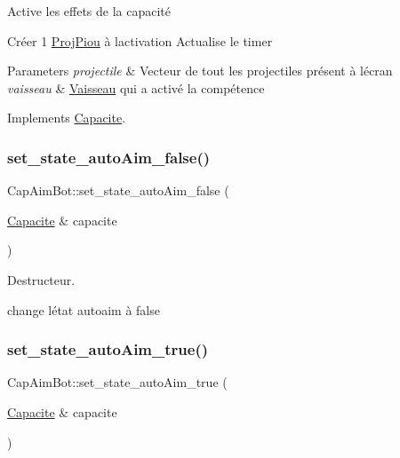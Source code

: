Active les effets de la capacité 

Créer 1 \mbox{\hyperlink{class_proj_piou}{Proj\+Piou}} à l\textquotesingle{}activation Actualise le timer 
\begin{DoxyParams}{Parameters}
{\em projectile} & Vecteur de tout les projectiles présent à l\textquotesingle{}écran \\
\hline
{\em vaisseau} & \mbox{\hyperlink{class_vaisseau}{Vaisseau}} qui a activé la compétence \\
\hline
\end{DoxyParams}


Implements \mbox{\hyperlink{class_capacite_a85355aeb1d4acc049ed97da177acbd5f}{Capacite}}.

\mbox{\label{class_cap_aim_bot_aaa7c76ca67faf851d511c7c46ccc8139}} 
\subsubsection{\texorpdfstring{set\+\_\+state\+\_\+auto\+Aim\+\_\+false()}{set\_state\_autoAim\_false()}}
{\footnotesize\ttfamily Cap\+Aim\+Bot\+::set\+\_\+state\+\_\+auto\+Aim\+\_\+false (\begin{DoxyParamCaption}\item[{\mbox{\hyperlink{class_capacite}{Capacite}} \&}]{capacite }\end{DoxyParamCaption})}



Destructeur. 

change l\textquotesingle{}état autoaim à false \mbox{\label{class_cap_aim_bot_a79cd2b5ebd0936e133113d5563c31396}} 
\subsubsection{\texorpdfstring{set\+\_\+state\+\_\+auto\+Aim\+\_\+true()}{set\_state\_autoAim\_true()}}
{\footnotesize\ttfamily Cap\+Aim\+Bot\+::set\+\_\+state\+\_\+auto\+Aim\+\_\+true (\begin{DoxyParamCaption}\item[{\mbox{\hyperlink{class_capacite}{Capacite}} \&}]{capacite }\end{DoxyParamCaption})}



